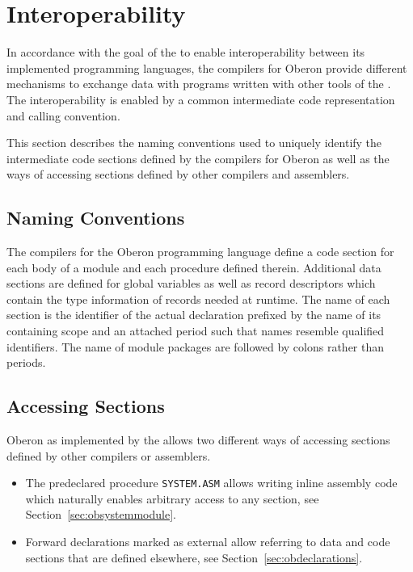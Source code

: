 \obprint
\obcheck
\obdump
\obrun
\obcpp
\obdoc
\obhtml
\oblatex
\obcode
\obamda
\obamdb
\obamdc
\obarma
\obarmb
\obarmc
\obarmcfpe
\obavr
\obavrtt
\obmabk
\obmibl
\obmipsa
\obmipsb
\obmmix
\oborok
\obppca
\obppcb
\obrisc
\obwasm
\obxtensa

\section{Interoperability}

In accordance with the goal of the \ecs{} to enable interoperability between its implemented programming languages,
the compilers for Oberon provide different mechanisms to exchange data with programs written with other tools of the \ecs{}.
The interoperability is enabled by a common intermediate code representation and calling convention. \seecode

This section describes the naming conventions used to uniquely identify the intermediate code sections defined by the compilers for Oberon
as well as the ways of accessing sections defined by other compilers and assemblers.

\subsection{Naming Conventions}

The compilers for the Oberon programming language define a code section for each body of a module and each procedure defined therein.
Additional data sections are defined for global variables as well as record descriptors which contain the type information of records needed at runtime.
The name of each section is the identifier of the actual declaration prefixed by the name of its containing scope and an attached period such that names resemble qualified identifiers.
The name of module packages are followed by colons rather than periods.

\subsection{Accessing Sections}\label{sec:obaccessingsections}

Oberon as implemented by the \ecs{} allows two different ways of accessing sections defined by other compilers or assemblers.

\begin{itemize}

\item
The predeclared procedure \texttt{SYSTEM.ASM} allows writing inline assembly code which naturally enables arbitrary access to any section, see Section~\ref{sec:obsystemmodule}.
\seeassembly

\item
Forward declarations marked as external allow referring to data and code sections that are defined elsewhere, see Section~\ref{sec:obdeclarations}.

\end{itemize}

\concludechapter
